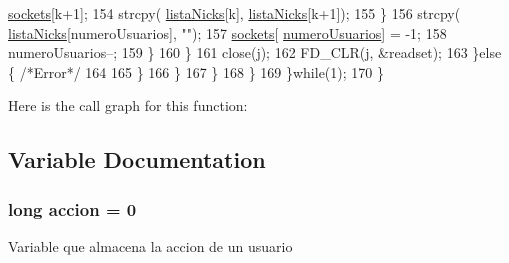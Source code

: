 \begin{DoxyCode}
      \hyperlink{_g-2361-06-_p1-_server_8c_a7724e53f22e431d1ecb6516951a172e1}{sockets}[k+1];
154                                                                         strcpy(
      \hyperlink{_g-2361-06-_p1-_server_8c_a713172366a6be2fbf8456a4b43702603}{listaNicks}[k], \hyperlink{_g-2361-06-_p1-_server_8c_a713172366a6be2fbf8456a4b43702603}{listaNicks}[k+1]);
155                                                                 \}
156                                                                 strcpy(
      \hyperlink{_g-2361-06-_p1-_server_8c_a713172366a6be2fbf8456a4b43702603}{listaNicks}[numeroUsuarios], \textcolor{stringliteral}{""});
157                                                                 \hyperlink{_g-2361-06-_p1-_server_8c_a7724e53f22e431d1ecb6516951a172e1}{sockets}[
      \hyperlink{_g-2361-06-_p1-_server_8c_ac9a5ec6f534d2a8e2a870179807d32dc}{numeroUsuarios}] = -1;
158                                                                 numeroUsuarios--;
159                                                         \}
160                                                 \}
161                                                 close(j);
162                                 FD\_CLR(j, &readset);
163                             \}\textcolor{keywordflow}{else} \{ \textcolor{comment}{/*Error*/}
164 
165                             \}
166                         \}      
167                 \}     
168                 \}
169         \}\textcolor{keywordflow}{while}(1);
170 \}
\end{DoxyCode}


Here is the call graph for this function\+:




\subsection{Variable Documentation}
\hypertarget{_g-2361-06-_p1-_server_8c_a93e785c991445d8b8ee99c2e51242d5a}{}
\subsubsection[{accion}]{\setlength{\rightskip}{0pt plus 5cm}long accion = 0}\label{_g-2361-06-_p1-_server_8c_a93e785c991445d8b8ee99c2e51242d5a}
Variable que almacena la accion de un usuario \hypertarget{_g-2361-06-_p1-_server_8c_adf86742e21384f58f8999d8317e6a370}{}
